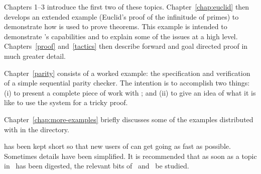 Chapters 1--3 introduce the first two of these topics.
Chapter~\ref{chap:euclid} then develops an extended example (Euclid's
proof of the infinitude of primes) to demonstrate how \HOL{} is used
to prove theorems.  This example is intended to demonstrate \HOL{}'s
capabilities and to explain some of the issues at a high level.
Chapters~\ref{proof} and~\ref{tactics} then describe forward and goal
directed proof in much greater detail.

Chapter~\ref{parity} consists of a worked example: the specification
and verification of a simple sequential parity checker.  The intention
is to accomplish two things: (i) to present a complete piece of work
with \HOL; and (ii) to give an idea of what it is like to use the
\HOL{} system for a tricky proof.

Chapter~\ref{chap:more-examples} briefly discusses some of the
examples distributed with \holn{} in the  directory.




\vspace{1cm}

\noindent \TUTORIAL{} has been kept short so that new users of \HOL{} can get
going as fast as possible. Sometimes details have been simplified. It
is recommended that as soon as a topic in \TUTORIAL\ has been
digested, the relevant bits of \DESCRIPTION\ and \REFERENCE\ be
studied.

